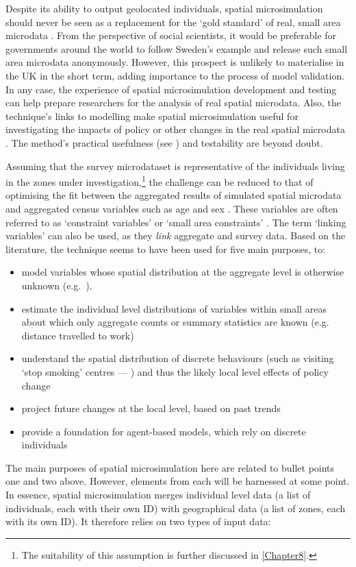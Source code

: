 Despite its ability to output geolocated individuals,
spatial microsimulation should never be seen as a
replacement for the `gold standard' of real,
small area microdata \citep[p.~4]{Martin2002}. From the perspective of social
scientists, it would be preferable for governments around the world to follow
Sweden's example and release such small area microdata anonymously. However, this
prospect is unlikely to materialise in the UK in the short term,
adding importance to the process
of model validation. In any case, the experience of spatial microsimulation
development and testing can help prepare researchers for the analysis of real
spatial microdata. Also, the technique's links to modelling make spatial
microsimulation useful for investigating the impacts of policy or other
changes in the real spatial microdata \citep{Holm1987}.
The method's practical usefulness (see \citealp{Tomintz2008})
and testability \citep{Edwards2009} are beyond doubt.

Assuming that the survey microdataset is representative of the
individuals living in the zones under investigation,\footnote{The suitability
of this assumption is further discussed in \cref{Chapter8}.} the
challenge can be reduced to that of optimising the fit between
the aggregated results of simulated
spatial microdata and aggregated census variables such as age
and sex \citep{Williamson1998}. These variables are often
referred to as `constraint variables' or `small area constraints'
\citep{Hermes2012a}. The term `linking variables' can also be used, as they
\emph{link} aggregate and survey data.
Based on the literature, the technique seems to have been used for five main
purposes, to:
\begin{itemize}
 \item model variables whose spatial distribution at the aggregate level is
otherwise unknown (e.g.~\citealp{Ballas1999}).
\item estimate the individual level distributions of variables within small
areas about which only aggregate counts or summary statistics are known (e.g.
distance travelled to work)
\item understand the spatial distribution of discrete behaviours
(such as visiting `stop smoking' centres --- \citealp{Tomintz2008})
and thus the likely local level effects of policy change \citep{Ballas2001}
\item project future changes at the local level, based on past trends
\citep{Ballas2005}
\item provide a foundation for agent-based models, which rely on
discrete individuals \citep{Ballas2007simb, Pritchard2012, Wu2010}
\end{itemize}
The main purposes of spatial microsimulation here are
related to bullet points one
and two above. However, elements from each will be harnessed at some
point.
In essence, spatial microsimulation merges individual level data (a list
of individuals, each with their own ID) with geographical data (a list of
zones, each with its own ID). It therefore relies on two types of input data:

